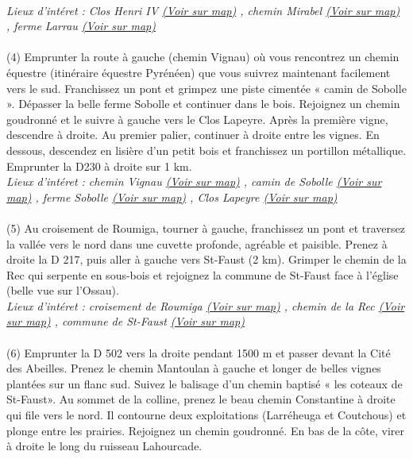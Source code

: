 \documentclass{article}
\begin{document}
        \\\emph{Lieux d'intéret : Clos Henri IV 
        \href{https://www.google.com/maps/?q=43.287530, -0.391115}{(Voir sur map)}
        , chemin Mirabel 
        \href{https://www.google.com/maps/?q=43.287530, -0.391115}{(Voir sur map)}
        , ferme Larrau 
        \href{https://www.google.com/maps/?q=43.287530, -0.391115}{(Voir sur map)}
        }\\~\\
(4)\indent
            Emprunter la route à gauche (chemin Vignau) où vous rencontrez un chemin équestre (itinéraire équestre Pyrénéen) que vous suivrez maintenant facilement vers le sud. Franchissez un pont et grimpez une piste cimentée « camin de Sobolle ». Dépasser la belle ferme Sobolle et continuer dans le bois. Rejoignez un chemin goudronné et le suivre à gauche vers le Clos Lapeyre. Après la première vigne, descendre à droite. Au premier palier, continuer à droite entre les vignes. En dessous, descendez en lisière d'un petit bois et franchissez un portillon métallique. Emprunter la D230 à droite sur 1 km.
        \\\emph{Lieux d'intéret : chemin Vignau 
        \href{https://www.google.com/maps/?q=43.287530, -0.391115}{(Voir sur map)}
        ,  camin de Sobolle 
        \href{https://www.google.com/maps/?q=43.287530, -0.391115}{(Voir sur map)}
        , ferme Sobolle 
        \href{https://www.google.com/maps/?q=43.287530, -0.391115}{(Voir sur map)}
        , Clos Lapeyre 
        \href{https://www.google.com/maps/?q=43.287530, -0.391115}{(Voir sur map)}
        }\\~\\
(5)\indent
            Au croisement de Roumiga, tourner à gauche, franchissez un pont et traversez la vallée vers le nord dans une cuvette profonde, agréable et paisible. Prenez à droite la D 217, puis aller à gauche vers St-Faust (2 km). Grimper le chemin de la Rec qui serpente en sous-bois et rejoignez la commune de St-Faust face à l'église (belle vue sur l'Ossau).
        \\\emph{Lieux d'intéret : croisement de Roumiga 
        \href{https://www.google.com/maps/?q=43.287530, -0.391115}{(Voir sur map)}
        , chemin de la Rec 
        \href{https://www.google.com/maps/?q=43.287530, -0.391115}{(Voir sur map)}
        , commune de St-Faust 
        \href{https://www.google.com/maps/?q=43.287530, -0.391115}{(Voir sur map)}
        }\\~\\
(6)\indent
            Emprunter la D 502 vers la droite pendant 1500 m et passer devant la Cité des Abeilles. Prenez le chemin Mantoulan à gauche et longer de belles vignes plantées sur un flanc sud. Suivez le balisage d'un chemin baptisé « les coteaux de St-Faust». Au sommet de la colline, prenez le beau chemin Constantine à droite qui file vers le nord. Il contourne deux exploitations (Larréheuga et Coutchous) et plonge entre les prairies. Rejoignez un chemin goudronné. En bas de la côte, virer à droite le long du ruisseau Lahourcade.
\end{document}
